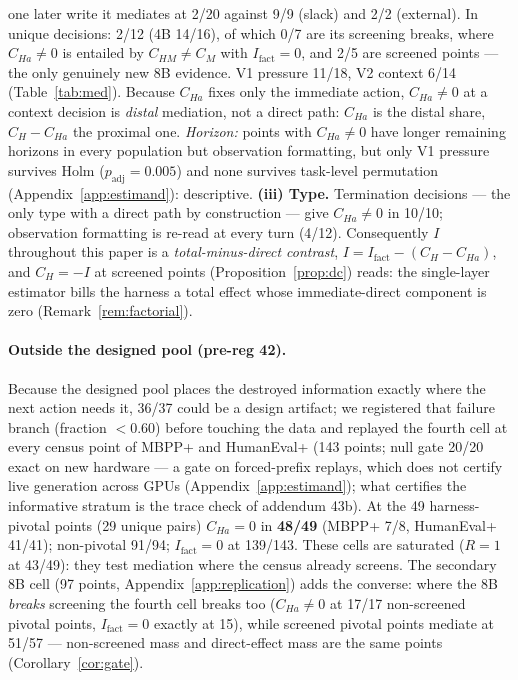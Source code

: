 \documentclass{article}
\theoremstyle{remark}
\begin{document}
one later write it mediates at 2/20 against 9/9 (slack) and 2/2
(external). In unique decisions: 2/12 (4B 14/16), of which 0/7 are its
screening breaks, where $C_{Ha} \neq 0$ is entailed by $C_{HM} \neq C_M$
with $I_{\text{fact}} = 0$, and 2/5 are screened points --- the only
genuinely new 8B evidence. V1 pressure 11/18, V2 context 6/14
(Table~\ref{tab:med}). Because $C_{Ha}$ fixes only the immediate action,
$C_{Ha} \neq 0$ at a context decision is \emph{distal} mediation, not a
direct path: $C_{Ha}$ is the distal share, $C_H - C_{Ha}$ the proximal
one. \emph{Horizon:} points with $C_{Ha} \neq 0$ have longer remaining
horizons in every population but observation formatting, but only V1
pressure survives Holm ($p_{\text{adj}} = 0.005$) and none survives
task-level permutation (Appendix~\ref{app:estimand}): descriptive. \textbf{(iii) Type.} Termination decisions --- the only type with a
direct path by construction --- give $C_{Ha} \neq 0$ in 10/10;
observation formatting is re-read at every turn (4/12). Consequently $I$
throughout this paper is a \emph{total-minus-direct contrast}, $I =
I_{\text{fact}} - (C_H - C_{Ha})$, and $C_H = -I$ at screened points
(Proposition~\ref{prop:dc}) reads: the single-layer estimator bills the
harness a total effect whose immediate-direct component is zero
(Remark~\ref{rem:factorial}).

\paragraph{Outside the designed pool (pre-reg 42).} Because the designed
pool places the destroyed information exactly where the next action
needs it, 36/37 could be a design artifact; we registered that failure
branch (fraction $< 0.60$) before touching the data and replayed the
fourth cell at every census point of MBPP+ and HumanEval+ (143 points;
null gate 20/20 exact on new hardware --- a gate on forced-prefix
replays, which does not certify live generation across GPUs
(Appendix~\ref{app:estimand}); what certifies the informative stratum
is the trace check of addendum 43b). At the 49 harness-pivotal points
(29 unique pairs) $C_{Ha} = 0$ in \textbf{48/49} (MBPP+ 7/8, HumanEval+
41/41); non-pivotal 91/94; $I_{\text{fact}} = 0$ at 139/143. These cells
are saturated ($R = 1$ at 43/49): they test mediation where the census
already screens. The secondary 8B cell (97 points,
Appendix~\ref{app:replication}) adds the converse: where the 8B
\emph{breaks} screening the fourth cell breaks too ($C_{Ha} \neq 0$ at
17/17 non-screened pivotal points, $I_{\text{fact}} = 0$ exactly at 15),
while screened pivotal points mediate at 51/57 --- non-screened mass and
direct-effect mass are the same points (Corollary~\ref{cor:gate}).
\end{document}
